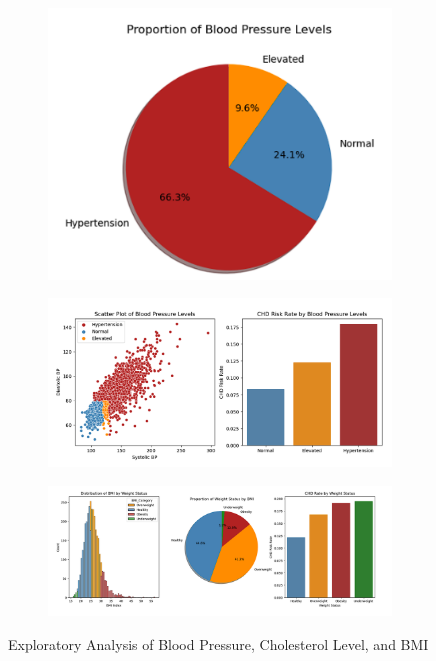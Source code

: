 \documentclass[conference]{IEEEtran}
\begin{document}
\begin{figure}[H]
    \centering
    \begin{subfigure}[b]{0.3\textwidth}
        \centering
        \includegraphics[width=\textwidth]{fig6a.png}
        \caption{}
    \end{subfigure}
    \hfill
    \begin{subfigure}[b]{0.5\textwidth}
        \centering
        \includegraphics[width=\textwidth]{fig6b.png}
        \caption{}
    \end{subfigure}
    \hfill
    \begin{subfigure}[b]{0.5\textwidth}
        \centering
        \includegraphics[width=\textwidth]{fig6c.png}
        \caption{}
    \end{subfigure}
    \caption{Exploratory Analysis of Blood Pressure, Cholesterol Level, and BMI}
    \label{fig:exploratory_analysis}
\end{figure}
\end{document}
